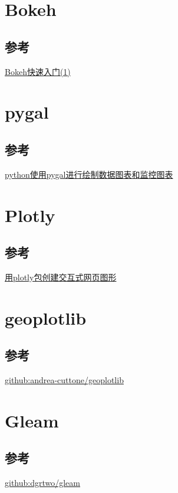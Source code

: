 \documentclass{ctexart}
\begin{document}
\section{Bokeh}
\subsection{参考}
\href{http://youerning.blog.51cto.com/10513771/1709113}{Bokeh快速入门(1)}

\section{pygal}
\subsection{参考}
\href{http://rfyiamcool.blog.51cto.com/1030776/1378400}{python使用pygal进行绘制数据图表和监控图表}

\section{Plotly}
\subsection{参考}
\href{http://www.xueqing.tv/cms/article/93}{用plotly包创建交互式网页图形}


\section{geoplotlib}
\subsection{参考}
\href{https://github.com/andrea-cuttone/geoplotlib}{github:andrea-cuttone/geoplotlib}

\section{Gleam}
\subsection{参考}
\href{https://github.com/dgrtwo/gleam}{github:dgrtwo/gleam}
\end{document}
